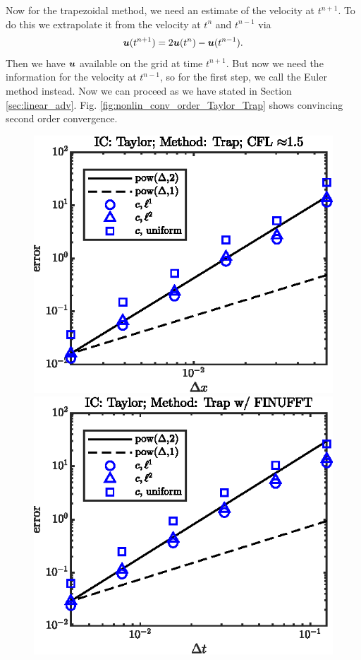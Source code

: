 \documentclass[11pt,letterpaper]{article}
\begin{document}
Now for the trapezoidal method, we need an estimate of the velocity at $t^{n+1}$. To do this we extrapolate it from the velocity at $t^n$ and $t^{n-1}$ via
\begin{align*}
    \boldsymbol{u}(t^{n+1}) = 2\boldsymbol{u}(t^n)-\boldsymbol{u}(t^{n-1}). 
\end{align*}
Then we have $\boldsymbol{u}$ available on the grid at time $t^{n+1}$. But now we need the information for the velocity at $t^{n-1}$, so for the first step, we call the Euler method instead. Now we can proceed as we have stated in Section \ref{sec:linear_adv}. Fig. \ref{fig:nonlin_conv_order_Taylor_Trap} shows convincing second order convergence. 
\begin{figure}[H]
    \centering
    \includegraphics{figs/nonlin_conv_order_Taylor_Trap}
    \includegraphics{figs/nonlin_conv_order_Taylor_finu_Trap}

\end{figure}
\end{document}
